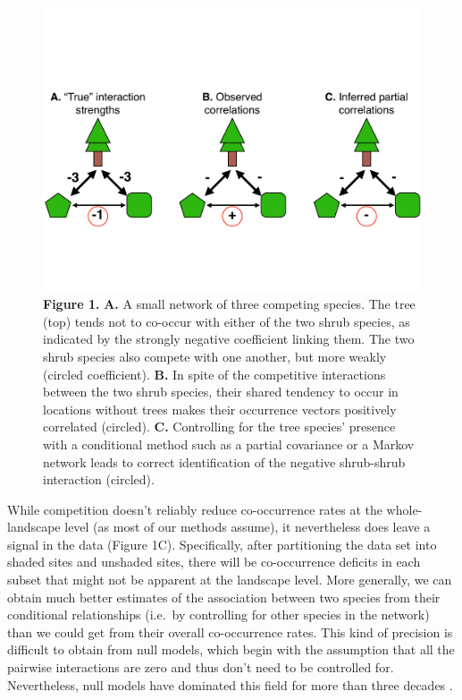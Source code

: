 \begin{figure}[htbp]
\centering
\includegraphics{figures/Figure_1.pdf}
\caption{\textbf{Figure 1.} \textbf{A.} A small network of three
competing species. The tree (top) tends not to co-occur with either of
the two shrub species, as indicated by the strongly negative coefficient
linking them. The two shrub species also compete with one another, but
more weakly (circled coefficient). \textbf{B.} In spite of the
competitive interactions between the two shrub species, their shared
tendency to occur in locations without trees makes their occurrence
vectors positively correlated (circled). \textbf{C.} Controlling for the
tree species' presence with a conditional method such as a partial
covariance or a Markov network leads to correct identification of the
negative shrub-shrub interaction (circled).}
\end{figure}

While competition doesn't reliably reduce co-occurrence rates at the
whole-landscape level (as most of our methods assume), it nevertheless
does leave a signal in the data (Figure 1C). Specifically, after
partitioning the data set into shaded sites and unshaded sites, there
will be co-occurrence deficits in each subset that might not be apparent
at the landscape level. More generally, we can obtain much better
estimates of the association between two species from their conditional
relationships (i.e.~by controlling for other species in the network)
than we could get from their overall co-occurrence rates. This kind of
precision is difficult to obtain from null models, which begin with the
assumption that all the pairwise interactions are zero and thus don't
need to be controlled for. Nevertheless, null models have dominated this
field for more than three decades
\citep{strong_ecological_1984, gotelli_empirical_2009}.

